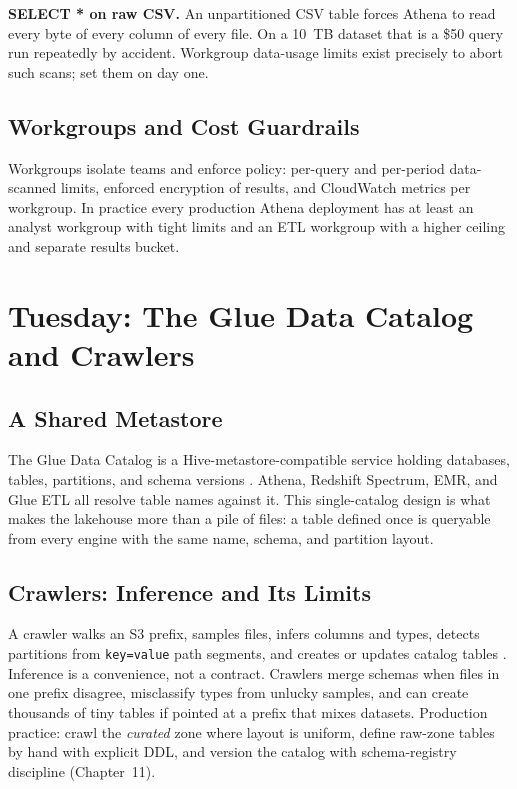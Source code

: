 \begin{pitfall}
\textbf{SELECT * on raw CSV.} An unpartitioned CSV table forces Athena to read every byte of every column of every file. On a 10~TB dataset that is a \$50 query run repeatedly by accident. Workgroup data-usage limits exist precisely to abort such scans; set them on day one.
\end{pitfall}

\subsection{Workgroups and Cost Guardrails}
Workgroups isolate teams and enforce policy: per-query and per-period data-scanned limits, enforced encryption of results, and CloudWatch metrics per workgroup. In practice every production Athena deployment has at least an analyst workgroup with tight limits and an ETL workgroup with a higher ceiling and separate results bucket.

\section{Tuesday: The Glue Data Catalog and Crawlers}
\subsection{A Shared Metastore}
The Glue Data Catalog is a Hive-metastore-compatible service holding databases, tables, partitions, and schema versions \cite{awsGlueCatalogDocs}. Athena, Redshift Spectrum, EMR, and Glue ETL all resolve table names against it. This single-catalog design is what makes the lakehouse more than a pile of files: a table defined once is queryable from every engine with the same name, schema, and partition layout.

\subsection{Crawlers: Inference and Its Limits}
A crawler walks an S3 prefix, samples files, infers columns and types, detects partitions from \texttt{key=value} path segments, and creates or updates catalog tables \cite{awsGlueCatalogDocs}. Inference is a convenience, not a contract. Crawlers merge schemas when files in one prefix disagree, misclassify types from unlucky samples, and can create thousands of tiny tables if pointed at a prefix that mixes datasets. Production practice: crawl the \emph{curated} zone where layout is uniform, define raw-zone tables by hand with explicit DDL, and version the catalog with schema-registry discipline (Chapter~11).

